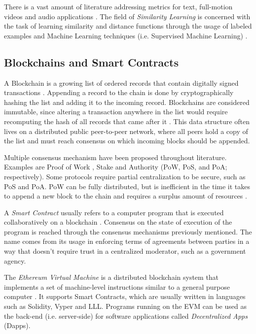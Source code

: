 \documentclass[conference]{IEEEtran}
\begin{document}
There is a vast amount of literature addressing metrics for text, full-motion videos and audio applications \cite{kulis2013metric}. The field of \emph{Similarity Learning} is concerned with the task of learning similarity and distance functions through the usage of labeled examples and Machine Learning techniques (i.e. Supervised Machine Learning) \cite{kulis2013metric}.
 

\subsection{Blockchains and Smart Contracts}
A Blockchain is a growing list of ordered records that contain digitally signed transactions \cite{antonopoulos2018mastering}. Appending a record to the chain is done by cryptographically hashing the list and adding it to the incoming record. Blockchains are considered immutable, since altering a transaction anywhere in the list would require recomputing the hash of all records that came after it \cite{antonopoulos2018mastering}. This data structure often lives on a distributed public peer-to-peer network, where all peers hold a copy of the list and must reach consensus on which incoming blocks should be appended. 

Multiple consensus mechanism have been proposed throughout literature. Examples are Proof of Work \cite{dwork1992pricing}, Stake \cite{king2012ppcoin} and Authority \cite{de2018pbft} (PoW, PoS, and PoA; respectively). Some protocols require partial centralization to be secure, such as PoS and PoA. PoW can be fully distributed, but is inefficient in the time it takes to append a new block to the chain and requires a surplus amount of resources \cite{dwork1992pricing}.

A \emph{Smart Contract} usually refers to a computer program that is executed collaboratively on a blockchain \cite{szabo1997idea}. Consensus on the state of execution of the program is reached through the consensus mechanisms previously mentioned. The name comes from its usage in enforcing terms of agreements between parties in a way that doesn't require trust in a centralized moderator, such as a government agency.

The \emph{Ethereum Virtual Machine} is a distributed blockchain system that implements a set of machine-level instructions similar to a general purpose computer \cite{wood2014ethereum}. It supports Smart Contracts, which are usually written in languages such as Solidity, Vyper and LLL. Programs running on the EVM can be used as the back-end (i.e. server-side) for software applications called \emph{Decentralized Apps} (Dapps).
\end{document}

